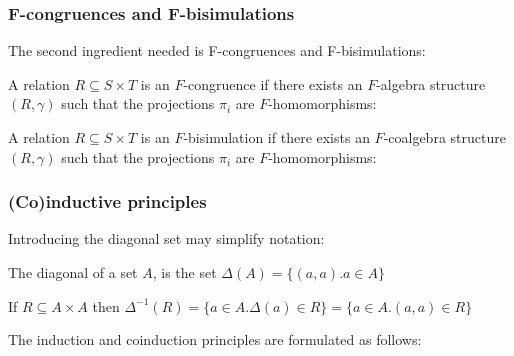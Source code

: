 \subsubsection{F-congruences and F-bisimulations}

The second ingredient needed is F-congruences and F-bisimulations:

\begin{definition}[Congruences]
A relation $R \subseteq S \times T$ is an $F$-congruence if there exists an $F$-algebra structure $(R,\gamma)$ such that the projections $\pi_i$ are $F$-homomorphisms:
	
\end{definition}

\begin{definition}[Bisimulations]
A relation $R \subseteq S \times T$ is an $F$-bisimulation if there exists an $F$-coalgebra structure $(R,\gamma)$ such that the projections $\pi_i$ are $F$-homomorphisms:
	
\end{definition}

\subsubsection{(Co)inductive principles}

Introducing the diagonal set may simplify notation:

\begin{definition}[Diagonal]
	The diagonal of a set $A$, is the set $\Delta(A) = \{(a,a). a \in A\}$
\end{definition}

If $R \subseteq A \times A$ then $\Delta^{-1}(R) = \{a \in A. \Delta(a) \in R\} = \{a \in A. (a,a) \in R\}$

The induction and coinduction principles are formulated as follows:

